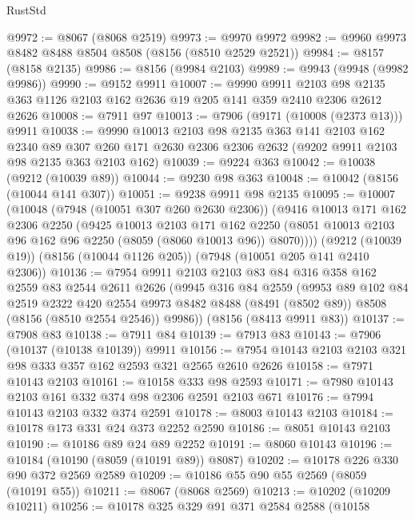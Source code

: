 \begin{lexlean}{RustStd}
\begin{coremodule}
@9972 := @8067 (@8068 @2519)
@9973 := @9970 @9972
@9982 := @9960 @9973 @8482 @8488 @8504 @8508 (@8156 (@8510 @2529 @2521))
@9984 := @8157 (@8158 @2135)
@9986 := @8156 (@9984 @2103)
@9989 := @9943 (@9948 (@9982 @9986))
@9990 := @9152 @9911
@10007 := @9990
    @9911
    @2103
    @98
    @2135
    @363
    @1126
    @2103
    @162
    @2636
    @19
    @205
    @141
    @359
    @2410
    @2306
    @2612
    @2626
@10008 := @7911 @97
@10013 := @7906 (@9171 (@10008 (@2373 @13))) @9911
@10038 := @9990
    @10013
    @2103
    @98
    @2135
    @363
    @141
    @2103
    @162
    @2340
    @89
    @307
    @260
    @171
    @2630
    @2306
    @2306
    @2632
    (@9202 @9911 @2103 @98 @2135 @363 @2103 @162)
@10039 := @9224 @363
@10042 := @10038 (@9212 (@10039 @89))
@10044 := @9230 @98 @363
@10048 := @10042 (@8156 (@10044 @141 @307))
@10051 := @9238 @9911 @98 @2135
@10095 := @10007
    (@10048
      (@7948 (@10051 @307 @260 @2630 @2306))
      (@9416
        @10013
        @171
        @162
        @2306
        @2250
        (@9425
          @10013
          @2103
          @171
          @162
          @2250
          (@8051 @10013 @2103 @96 @162 @96 @2250 (@8059 (@8060 @10013 @96)) @8070))))
    (@9212 (@10039 @19))
    (@8156 (@10044 @1126 @205))
    (@7948 (@10051 @205 @141 @2410 @2306))
@10136 := @7954
    @9911
    @2103
    @2103
    @83
    @84
    @316
    @358
    @162
    @2559
    @83
    @2544
    @2611
    @2626
    (@9945
      @316
      @84
      @2559
      (@9953
        @89
        @102
        @84
        @2519
        @2322
        @420
        @2554
        @9973
        @8482
        @8488
        (@8491 (@8502 @89))
        @8508
        (@8156 (@8510 @2554 @2546))
        @9986))
    (@8156 (@8413 @9911 @83))
@10137 := @7908 @83
@10138 := @7911 @84
@10139 := @7913 @83
@10143 := @7906 (@10137 (@10138 @10139)) @9911
@10156 := @7954 @10143 @2103 @2103 @321 @98 @333 @357 @162 @2593 @321 @2565 @2610 @2626
@10158 := @7971 @10143 @2103
@10161 := @10158 @333 @98 @2593
@10171 := @7980 @10143 @2103 @161 @332 @374 @98 @2306 @2591 @2103 @671
@10176 := @7994 @10143 @2103 @332 @374 @2591
@10178 := @8003 @10143 @2103
@10184 := @10178 @173 @331 @24 @373 @2252 @2590
@10186 := @8051 @10143 @2103
@10190 := @10186 @89 @24 @89 @2252
@10191 := @8060 @10143
@10196 := @10184 (@10190 (@8059 (@10191 @89)) @8087)
@10202 := @10178 @226 @330 @90 @372 @2569 @2589
@10209 := @10186 @55 @90 @55 @2569 (@8059 (@10191 @55))
@10211 := @8067 (@8068 @2569)
@10213 := @10202 (@10209 @10211)
@10256 := @10178
    @325
    @329
    @91
    @371
    @2584
    @2588
    (@10158

\end{coremodule}
\end{lexlean}

